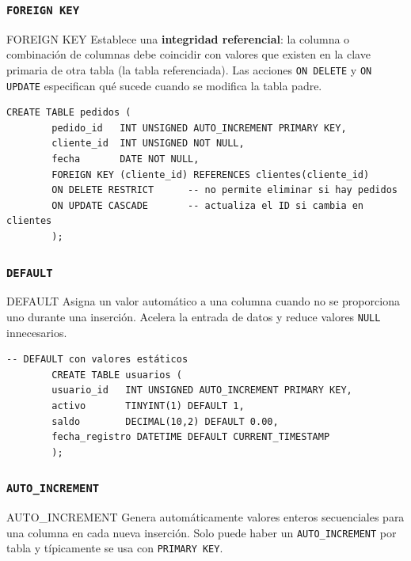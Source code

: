 \documentclass[12pt, a4paper]{article}
\begin{document}
	\subsubsection{\texttt{FOREIGN KEY}}
	
	\begin{definicion}{FOREIGN KEY}
		Establece una \textbf{integridad referencial}: la columna o combinación
		de columnas debe coincidir con valores que existen en la clave primaria
		de otra tabla (la tabla referenciada). Las acciones \texttt{ON DELETE}
		y \texttt{ON UPDATE} especifican qué sucede cuando se modifica la
		tabla padre.
	\end{definicion}
	
	\begin{lstlisting}[style=sql, caption={FOREIGN KEY con políticas de actualización}]
		CREATE TABLE pedidos (
		pedido_id   INT UNSIGNED AUTO_INCREMENT PRIMARY KEY,
		cliente_id  INT UNSIGNED NOT NULL,
		fecha       DATE NOT NULL,
		FOREIGN KEY (cliente_id) REFERENCES clientes(cliente_id)
		ON DELETE RESTRICT      -- no permite eliminar si hay pedidos
		ON UPDATE CASCADE       -- actualiza el ID si cambia en clientes
		);
	\end{lstlisting}
	
	\subsubsection{\texttt{DEFAULT}}
	
	\begin{definicion}{DEFAULT}
		Asigna un valor automático a una columna cuando no se proporciona
		uno durante una inserción. Acelera la entrada de datos y reduce
		valores \texttt{NULL} innecesarios.
	\end{definicion}
	
	\begin{lstlisting}[style=sql, caption={DEFAULT con valores estáticos y dinámicos}]
		-- DEFAULT con valores estáticos
		CREATE TABLE usuarios (
		usuario_id   INT UNSIGNED AUTO_INCREMENT PRIMARY KEY,
		activo       TINYINT(1) DEFAULT 1,
		saldo        DECIMAL(10,2) DEFAULT 0.00,
		fecha_registro DATETIME DEFAULT CURRENT_TIMESTAMP
		);
	\end{lstlisting}
	
	\subsubsection{\texttt{AUTO\_INCREMENT}}
	
	\begin{definicion}{AUTO\_INCREMENT}
		Genera automáticamente valores enteros secuenciales para una columna
		en cada nueva inserción. Solo puede haber un \texttt{AUTO\_INCREMENT}
		por tabla y típicamente se usa con \texttt{PRIMARY KEY}.
	\end{definicion}
	
\end{document}
